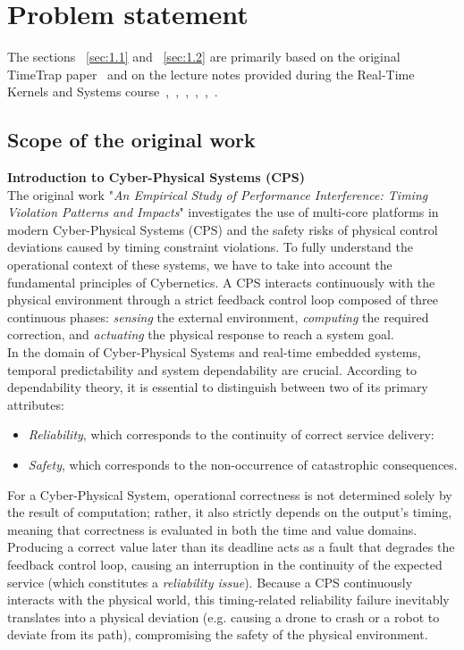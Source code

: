 \section{Problem statement}
The sections ~\ref{sec:1.1} and ~\ref{sec:1.2} are primarily based on the original TimeTrap paper~\cite{li2024timetrap} and on the lecture notes provided during the Real-Time Kernels and Systems course~\cite{T01},~\cite{T01-dep},~\cite{T06},~\cite{T09},~\cite{T11},~\cite{T14}.
\subsection{Scope of the original work}

\textbf{Introduction to Cyber-Physical Systems (CPS)} \label{sec:1.1} \\
The original work "\textit{An Empirical Study of Performance Interference: Timing Violation Patterns and Impacts}" investigates the use of multi-core platforms in modern Cyber-Physical Systems (CPS) and the safety risks of physical control deviations caused by timing constraint violations. To fully understand the operational context of these systems, we have to take into account the fundamental principles of Cybernetics. A CPS interacts continuously with the physical environment through a strict feedback control loop composed of three continuous phases: \textit{sensing} the external environment, \textit{computing} the required correction, and \textit{actuating} the physical response to reach a system goal.
\\
In the domain of Cyber-Physical Systems and real-time embedded systems, temporal predictability and system dependability are crucial. According to dependability theory, it is essential to distinguish between two of its primary attributes:
\begin{itemize}
    \item \textit{Reliability}, which corresponds to the continuity of correct service delivery:
    \item \textit{Safety}, which corresponds to the non-occurrence of catastrophic consequences.
\end{itemize}  
For a Cyber-Physical System, operational correctness is not determined solely by the result of computation; rather, it also strictly depends on the output's timing, meaning that correctness is evaluated in both the time and value domains. Producing a correct value later than its deadline acts as a fault that degrades the feedback control loop, causing an interruption in the continuity of the expected service (which constitutes a  \textit{reliability issue}). Because a CPS continuously interacts with the physical world, this timing-related reliability failure inevitably translates into a physical deviation (e.g. causing a drone to crash or a robot to deviate from its path), compromising the safety of the physical environment.
